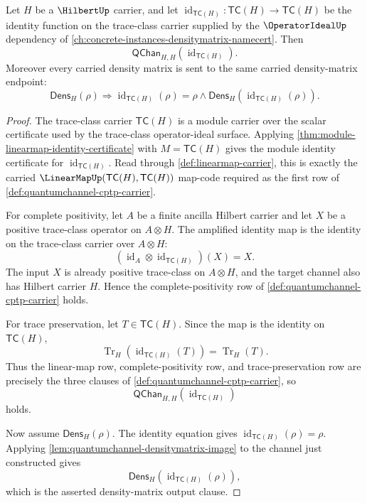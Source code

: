 
\begin{theorem}
\label{thm:quantumchannel-identity-channel-cptp}
Let $H$ be a $\HilbertUp$ carrier, and let $\operatorname{id}_{\mathsf{TC}(H)}:\mathsf{TC}(H)\to\mathsf{TC}(H)$ be the identity function on the trace-class carrier supplied by the $\OperatorIdealUp$ dependency of \autoref{ch:concrete-instances-densitymatrix-namecert}. Then
$$
\mathsf{QChan}_{H,H}(\operatorname{id}_{\mathsf{TC}(H)}).
$$
Moreover every carried density matrix is sent to the same carried density-matrix endpoint:
$$
\mathsf{Dens}_H(\rho)
\Longrightarrow
\operatorname{id}_{\mathsf{TC}(H)}(\rho)=\rho
\land
\mathsf{Dens}_H(\operatorname{id}_{\mathsf{TC}(H)}(\rho)).
$$
\end{theorem}
\begin{proof}
The trace-class carrier $\mathsf{TC}(H)$ is a module carrier over the scalar certificate used by the trace-class operator-ideal surface. Applying \autoref{thm:module-linearmap-identity-certificate} with $M=\mathsf{TC}(H)$ gives the module identity certificate for $\operatorname{id}_{\mathsf{TC}(H)}$. Read through \autoref{def:linearmap-carrier}, this is exactly the carried $\LinearMapUp(\mathsf{TC}(H),\mathsf{TC}(H))$ map-code required as the first row of \autoref{def:quantumchannel-cptp-carrier}.

For complete positivity, let $A$ be a finite ancilla Hilbert carrier and let $X$ be a positive trace-class operator on $A\otimes H$. The amplified identity map is the identity on the trace-class carrier over $A\otimes H$:
$$
(\operatorname{id}_A\otimes\operatorname{id}_{\mathsf{TC}(H)})(X)=X.
$$
The input $X$ is already positive trace-class on $A\otimes H$, and the target channel also has Hilbert carrier $H$. Hence the complete-positivity row of \autoref{def:quantumchannel-cptp-carrier} holds.

For trace preservation, let $T\in\mathsf{TC}(H)$. Since the map is the identity on $\mathsf{TC}(H)$,
$$
\operatorname{Tr}_H(\operatorname{id}_{\mathsf{TC}(H)}(T))
=
\operatorname{Tr}_H(T).
$$
Thus the linear-map row, complete-positivity row, and trace-preservation row are precisely the three clauses of \autoref{def:quantumchannel-cptp-carrier}, so
$$
\mathsf{QChan}_{H,H}(\operatorname{id}_{\mathsf{TC}(H)})
$$
holds.

Now assume $\mathsf{Dens}_H(\rho)$. The identity equation gives $\operatorname{id}_{\mathsf{TC}(H)}(\rho)=\rho$. Applying \autoref{lem:quantumchannel-densitymatrix-image} to the channel just constructed gives
$$
\mathsf{Dens}_H(\operatorname{id}_{\mathsf{TC}(H)}(\rho)),
$$
which is the asserted density-matrix output clause.
\end{proof}

